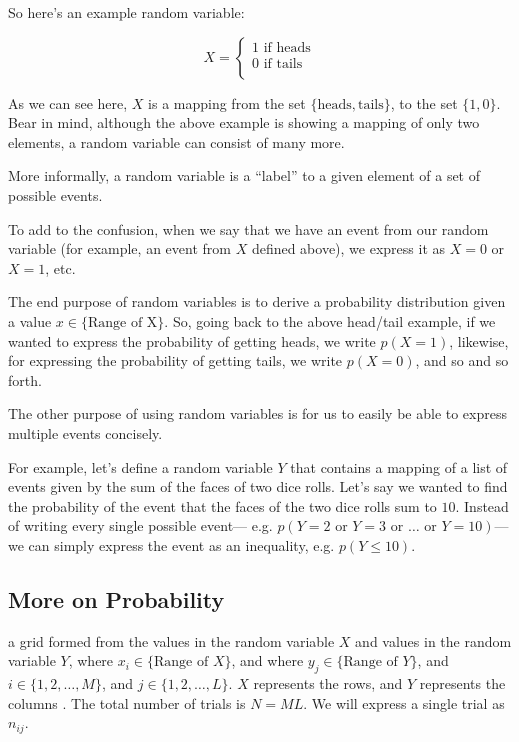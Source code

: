 \documentclass{tufte-handout}
\begin{document}
So here's an example random variable:

\begin{equation}
  X =
    \begin{cases}
      1 \text{ if } \text{heads} \\
      0 \text{ if } \text{tails} \\
    \end{cases}
\end{equation}

As we can see here, $X$ is a mapping from the set $\{ \text{heads},
\text{tails} \}$, to the set $\{ 1, 0 \}$. Bear in mind, although the above
example is showing a mapping of only two elements, a random variable can consist
of many more.

More informally, a random variable is a ``label'' to a given element of a set of
possible events.

To add to the confusion, when we say that we have an event from our random
variable (for example, an event from $X$ defined above), we express it as
$X = 0$ or $X = 1$, etc.

The end purpose of random variables is to derive a probability distribution
given a value $x \in \{ \text{Range of X} \}$. So, going back to the above
head/tail example, if we wanted to express the probability of getting heads, we
write $p(X = 1)$, likewise, for expressing the probability of getting tails, we
write $p(X = 0)$, and so and so forth.

The other purpose of using random variables is for us to easily be able to
express multiple events concisely.

For example, let's define a random variable $Y$ that contains a mapping of a
list of events given by the sum of the faces of two dice rolls. Let's say we
wanted to find the probability of the event that the faces of the two dice rolls
sum to $10$. Instead of writing every single possible event---
e.g. $p(Y = 2 \text{ or } Y = 3 \text{ or } \ldots \text{ or } Y = 10)$---we can
simply express the event as an inequality, e.g. $p(Y \leq 10)$.

\subsection{More on Probability}

 a grid formed from the values in the random variable $X$
and values in the random variable $Y$, where $x_i \in \{\text{Range of } X\}$,
and where $y_j \in \{\text{Range of } Y\}$, and $i \in \{ 1, 2, \ldots, M \}$,
and $j \in \{ 1, 2, \ldots, L \}$. $X$ represents the rows, and $Y$ represents
the columns . The total number of trials is $N = ML$. We will express
a single trial as $n_{ij}$.
\end{document}
